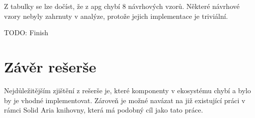 Z tabulky se lze dočíst, že z \gls{apg} chybí 8 návrhových vzorů.
Některé návrhové vzory nebyly zahrnuty v analýze, protože jejich implementace je triviální.

TODO: Finish

\section{Závěr rešerše}

Nejdůležitějším zjištění z rešerše je, které komponenty v ekosystému chybí a bylo by je vhodné implementovat.
Zároveň je možné navázat na již existující práci v rámci Solid Aria knihovny, která má podobný cíl jako tato práce.

